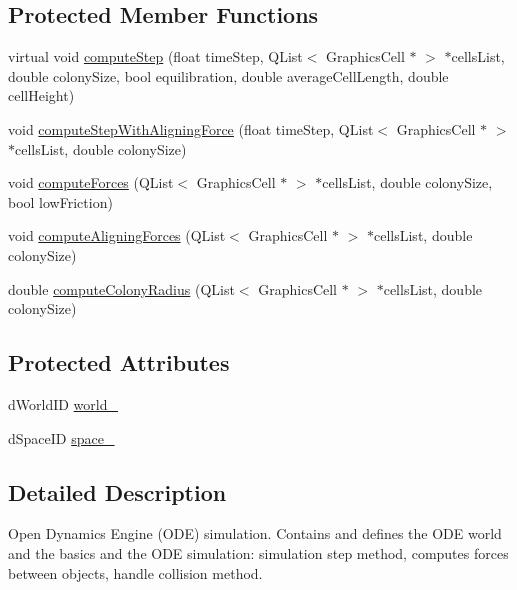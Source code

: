 \subsection*{\-Protected \-Member \-Functions}
\begin{DoxyCompactItemize}
\item 
virtual void \hyperlink{class_o_d_e_simulation_ac5ca4e063d5021dfbb6fd1b3d8004a8a}{compute\-Step} (float time\-Step, \-Q\-List$<$ \-Graphics\-Cell $\ast$ $>$ $\ast$cells\-List, double colony\-Size, bool equilibration, double average\-Cell\-Length, double cell\-Height)
\item 
void \hyperlink{class_o_d_e_simulation_a55e70b91c52db2998b169148c6e4b853}{compute\-Step\-With\-Aligning\-Force} (float time\-Step, \-Q\-List$<$ \-Graphics\-Cell $\ast$ $>$ $\ast$cells\-List, double colony\-Size)
\item 
void \hyperlink{class_o_d_e_simulation_a5e50af215ed7e46ec872d1fc7dc2cc7b}{compute\-Forces} (\-Q\-List$<$ \-Graphics\-Cell $\ast$ $>$ $\ast$cells\-List, double colony\-Size, bool low\-Friction)
\item 
void \hyperlink{class_o_d_e_simulation_a25eefbb4cafc5a920837f3469dcee977}{compute\-Aligning\-Forces} (\-Q\-List$<$ \-Graphics\-Cell $\ast$ $>$ $\ast$cells\-List, double colony\-Size)
\item 
double \hyperlink{class_o_d_e_simulation_a1a69251dfb38f5be8b7bc1947ea06f98}{compute\-Colony\-Radius} (\-Q\-List$<$ \-Graphics\-Cell $\ast$ $>$ $\ast$cells\-List, double colony\-Size)
\end{DoxyCompactItemize}
\subsection*{\-Protected \-Attributes}
\begin{DoxyCompactItemize}
\item 
d\-World\-I\-D \hyperlink{class_o_d_e_simulation_ab01265ac8b2ec870b00c35e017d9cd48}{world\-\_\-}
\item 
d\-Space\-I\-D \hyperlink{class_o_d_e_simulation_afe195e9dc824b0311b2959e8bd058c19}{space\-\_\-}
\end{DoxyCompactItemize}


\subsection{\-Detailed \-Description}
\-Open \-Dynamics \-Engine (\-O\-D\-E) simulation. \-Contains and defines the \-O\-D\-E world and the basics and the \-O\-D\-E simulation\-: simulation step method, computes forces between objects, handle collision method. 

